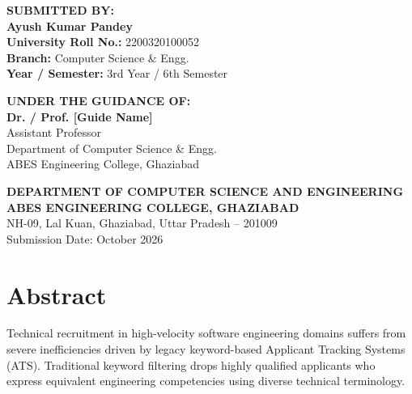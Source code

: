 \documentclass[12pt, a4paper]{article}
\begin{document}
\begin{titlepage}
    \vfill
    
    \begin{minipage}[t]{0.48\textwidth}
        \flushleft
        {\large \textbf{\color{primary} SUBMITTED BY:}}\\[0.25cm]
        \textbf{\large Ayush Kumar Pandey}\\[0.1cm]
        \textbf{University Roll No.:} 2200320100052\\
        \textbf{Branch:} Computer Science \& Engg.\\
        \textbf{Year / Semester:} 3rd Year / 6th Semester
    \end{minipage}
    \hfill
    \begin{minipage}[t]{0.48\textwidth}
        \flushleft
        {\large \textbf{\color{primary} UNDER THE GUIDANCE OF:}}\\[0.25cm]
        \textbf{\large Dr. / Prof. [Guide Name]}\\[0.1cm]
        Assistant Professor\\
        Department of Computer Science \& Engg.\\
        ABES Engineering College, Ghaziabad
    \end{minipage}
    
    \vfill
    \vspace{0.6cm}
    
    {\small \textbf{DEPARTMENT OF COMPUTER SCIENCE AND ENGINEERING}}\\[0.1cm]
    {\large \textbf{\color{primary} ABES ENGINEERING COLLEGE, GHAZIABAD}}\\[0.1cm]
    {\small NH-09, Lal Kuan, Ghaziabad, Uttar Pradesh -- 201009}\\[0.15cm]
    {\footnotesize Submission Date: October 2026}
    \vspace*{0.2cm}
\end{titlepage}

\newpage

\setcounter{section}{1}

\section{Abstract}
Technical recruitment in high-velocity software engineering domains suffers from severe inefficiencies driven by legacy keyword-based Applicant Tracking Systems (ATS). Traditional keyword filtering drops highly qualified applicants who express equivalent engineering competencies using diverse technical terminology. 
\end{document}
